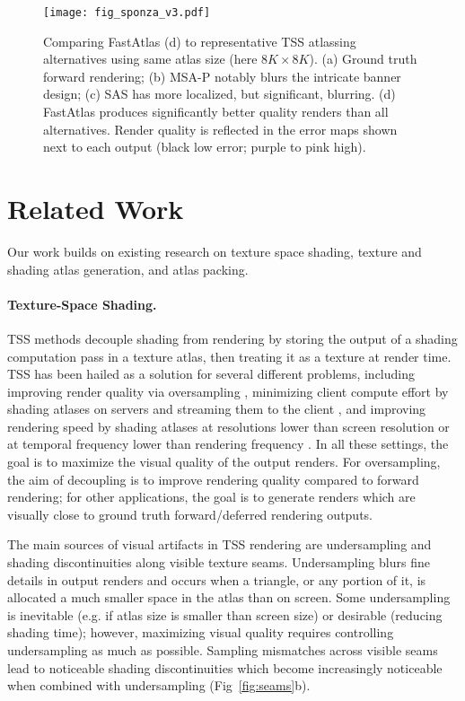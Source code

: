 \begin{figure*}[t]
\texttt{[image: fig\_sponza\_v3.pdf]}
\caption{Comparing FastAtlas (d) to representative TSS atlassing alternatives using same atlas size (here $8K\times 8K$). (a) Ground truth forward rendering; (b) MSA-P  \cite{Neff2022MSA} notably blurs the intricate banner design; (c) SAS \cite{mueller2018shading} has more localized, but significant, blurring. (d) FastAtlas produces significantly better quality renders than all alternatives. Render quality is reflected in the \FLIP error maps shown next to each output (black low error; purple to pink high).}
\label{fig:prev_work}
\end{figure*}

\section{Related Work}
\label{sec:related}

Our work builds on existing research on texture space shading, texture and shading atlas generation, and atlas packing. 

\paragraph*{Texture-Space Shading.} 
TSS methods decouple shading from rendering by storing the output of a shading computation pass in a texture atlas, then treating it as a texture at render time. TSS has been hailed as a solution for several different problems, including improving render quality via oversampling \cite{Baker2022,baker:2016}, minimizing client compute effort by shading atlases on servers and streaming them to the client \cite{mueller2018shading,hladky2019tessellated,hladky2021snakebinning,Neff2022MSA}, and improving rendering speed by shading atlases at resolutions lower than screen resolution or at temporal frequency lower than rendering frequency \cite{mueller2021tasa}. In all these settings, the goal is to maximize the visual quality of the output renders. For oversampling, the aim of decoupling is to improve rendering quality compared to forward rendering; for other applications, the goal is to generate renders which are visually close to ground truth forward/deferred rendering outputs.

The main sources of visual artifacts in TSS rendering are undersampling and shading discontinuities along visible texture seams. Undersampling blurs fine details in output renders and occurs when a triangle, or any portion of it, is allocated a much smaller space in the atlas than on screen. Some undersampling is inevitable (e.g. if atlas size is smaller than screen size) or desirable (reducing shading time); however, maximizing visual quality requires controlling undersampling as much as possible. Sampling mismatches across visible seams lead to noticeable shading discontinuities \cite{liu2017seamless} which become increasingly noticeable when combined with undersampling (Fig~\ref{fig:seams}b). 

